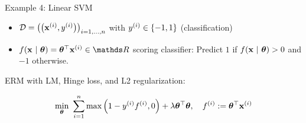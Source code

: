 \documentclass[11pt,compress,t,notes=noshow, xcolor=table]{beamer}
\begin{document}
\begin{vbframe}{Example 4: Linear SVM}

\begin{footnotesize}
\begin{itemize}
	\item $\mathcal{D} = \left(\left(\mathbf{x}^{(i)}, y^{(i)}\right)\right)_{i = 1, ..., n}$ with $y^{(i)} \in \{-1, 1\}$ (classification)
	\item $\fxt = \thetab^\top \xi \in \R$ scoring classifier: Predict $1$ if $f(\mathbf{x} ~|~ \bm{\theta}) > 0$ and $-1$ otherwise. 
\end{itemize}
\end{footnotesize}

ERM with LM, Hinge loss, and L2 regularization: 

$$
	\min_{\bm{\theta}} ~\sum\limits_{i=1}^n \max\left(1 - y^{(i)} f^{(i)}, 0\right) + \lambda \bm{\theta}^\top \bm{\theta}, \quad f^{(i)} := \bm{\theta}^\top \mathbf{x}^{(i)}
$$

\vspace*{-0.2cm}


\end{vbframe}
\end{document}

